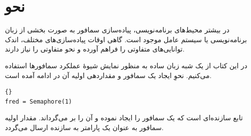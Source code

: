 \documentclass{book}
\begin{document}
\section{نحو}

    در بیشتر محیط‌های برنامه‌نویسی، پیاده‌سازی سمافور به صورت بخشی از زبان برنامه‌نویسی یا سیستم عامل موجود است. 
    گاهی اوقات پیاده‌سازی‌های مختلف،‌ اندک توانایی‌های متفاوتی را فراهم آورده و نحو متفاوتی را نیاز دارند.

    در این کتاب از یک شبه زبان ساده به منظور نمایش شیوهٔ عملکرد سمافورها استفاده می‌کنیم. 
    نحوِ ایجاد یک سمافور و مقداردهی اولیه آن در ادامه آمده است.
%
\begin{latin}
\begin{latin}
\begin{lstlisting}[title=\rl{نحوِ مقداردهی اولیه سمافور}]{}
fred = Semaphore(1)
\end{lstlisting}
\end{latin}
\end{latin}
%
    تابع  سازنده‌ای است که یک سمافور را ایجاد نموده 
    و آن را بر می‌گرداند. مقدار اولیه سمافور به عنوان یک پارامتر به سازنده ارسال می‌گردد. 
\end{document}
